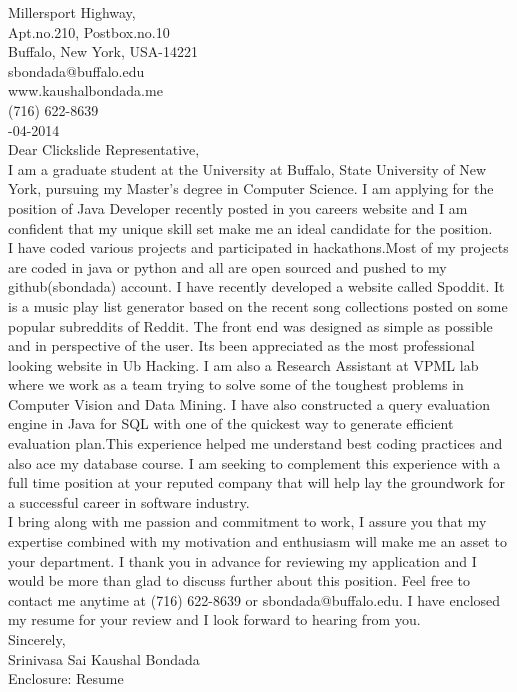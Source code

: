 \documentclass[10pt,letterpaper,oneside]{article}
\begin{document}
 Millersport Highway,\\
Apt.no.210, Postbox.no.10\\
Buffalo, New York, USA-14221\\
sbondada@buffalo.edu\\
www.kaushalbondada.me\\
(716) 622-8639\\

-04-2014\\
 
\noindent Dear Clickslide Representative,\\
 
I am a graduate student at the University at Buffalo, State University of New York, pursuing my
Master's degree in Computer Science. I am applying for the position of Java Developer recently posted
in you careers website and I am confident that my unique skill set make me an ideal candidate for the position.\\

I have coded various projects and participated in hackathons.Most of my projects are coded in java or python and 
all are open sourced and pushed to my github(sbondada) account. I have recently developed a website called 
Spoddit. It is a music play list generator based on the recent song collections posted on some popular subreddits 
of Reddit. The front end was designed as simple as possible and in perspective of the user. Its been
appreciated as the most professional looking website in Ub Hacking. I am also a Research Assistant at
VPML lab where we work as a team trying to solve some of the toughest problems in Computer Vision and
Data Mining. I have also constructed a query evaluation engine in Java for SQL with one of the quickest
way to generate efficient evaluation plan.This experience helped me understand best coding practices
and also ace my database course. I am seeking to complement this experience with a full time position at your reputed company that will help lay the groundwork for a successful career in software industry.\\

I bring along with me passion and commitment to work, I assure you that my expertise combined with my motivation
and enthusiasm will make me an asset to your department. I thank you in advance for reviewing my application and 
I would be more than glad to discuss further about this position. Feel free to contact me anytime at 
(716) 622-8639 or sbondada@buffalo.edu. I have enclosed my resume for your review and I look forward to hearing 
from you.\\
 
\noindent Sincerely,\\
Srinivasa Sai Kaushal Bondada\\
Enclosure: Resume\\
\end{document}
